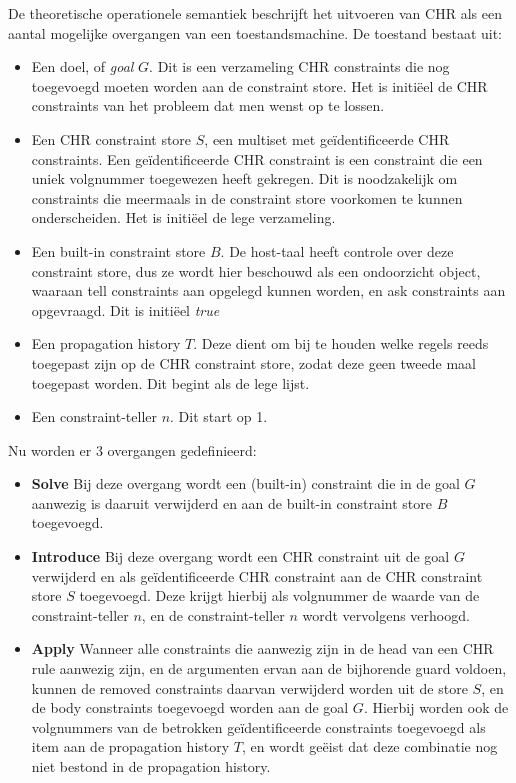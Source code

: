De theoretische operationele semantiek beschrijft het uitvoeren van CHR als een aantal mogelijke overgangen van een toestandsmachine. De toestand bestaat uit: \begin{itemize}
\item Een doel, of {\em goal} $G$. Dit is een verzameling CHR constraints die nog toegevoegd moeten worden aan de constraint store. Het is initi\"eel de CHR constraints van het probleem dat men wenst op te lossen.
\item Een CHR constraint store $S$, een multiset met ge\"identificeerde CHR constraints. Een ge\"identificeerde CHR constraint is een constraint die een uniek volgnummer toegewezen heeft gekregen. Dit is noodzakelijk om constraints die meermaals in de constraint store voorkomen te kunnen onderscheiden. Het is initi\"eel de lege verzameling.
\item Een built-in constraint store $B$. De host-taal heeft controle over deze constraint store, dus ze wordt hier beschouwd als een ondoorzicht object, waaraan tell constraints aan opgelegd kunnen worden, en ask constraints aan opgevraagd. Dit is initi\"eel {\em true}
\item Een propagation history $T$. Deze dient om bij te houden welke regels reeds toegepast zijn op de CHR constraint store, zodat deze geen tweede maal toegepast worden. Dit begint als de lege lijst. 
\item Een constraint-teller $n$. Dit start op 1.
\end{itemize}

Nu worden er 3 overgangen gedefinieerd: \begin{itemize}
\item {\bf Solve} Bij deze overgang wordt een (built-in) constraint die in de goal $G$ aanwezig is daaruit verwijderd en aan de built-in constraint store $B$ toegevoegd. 
\item {\bf Introduce} Bij deze overgang wordt een CHR constraint uit de goal $G$ verwijderd en als ge\"identificeerde CHR constraint aan de CHR constraint store $S$ toegevoegd. Deze krijgt hierbij als volgnummer de waarde van de constraint-teller $n$, en de constraint-teller $n$ wordt vervolgens verhoogd.
\item {\bf Apply} Wanneer alle constraints die aanwezig zijn in de head van een CHR rule aanwezig zijn, en de argumenten ervan aan de bijhorende guard voldoen, kunnen de removed constraints daarvan verwijderd worden uit de store $S$, en de body constraints toegevoegd worden aan de goal $G$. Hierbij worden ook de volgnummers van de betrokken ge\"identificeerde constraints toegevoegd als item aan de propagation history $T$, en wordt ge\"eist dat deze combinatie nog niet bestond in de propagation history.
\end{itemize}

